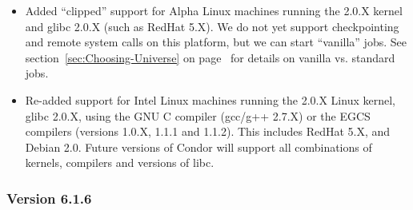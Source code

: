 \begin{itemize}

\item Added ``clipped'' support for Alpha Linux machines running the
2.0.X kernel and glibc 2.0.X (such as RedHat 5.X).
We do not yet support checkpointing and remote system calls on this
platform, but we can start ``vanilla'' jobs.
See section~\ref{sec:Choosing-Universe} on
page~\pageref{sec:Choosing-Universe} for details on vanilla
vs. standard jobs.

\item Re-added support for Intel Linux machines running the 2.0.X
Linux kernel, glibc 2.0.X, using the GNU C compiler (gcc/g++ 2.7.X) or
the EGCS compilers (versions 1.0.X, 1.1.1 and 1.1.2).
This includes RedHat 5.X, and Debian 2.0.
Future versions of Condor will support all combinations of kernels,
compilers and versions of libc.

\end{itemize}


\subsubsection{\label{sec:New-6-1-6}Version 6.1.6}

